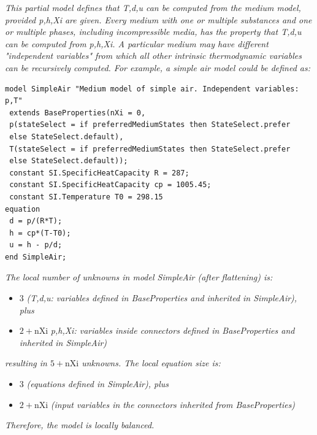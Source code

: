 \documentclass[10pt,a4paper]{report}
\def\Mcommentmid#1{\emph{#1}}
\begin{document}
\Mcommentmid{This partial model defines that \emph{T},\emph{d},\emph{u} can be computed from
the medium model, provided \emph{p},\emph{h},\emph{Xi} are given. Every medium with
one or multiple substances and one or multiple phases, including
incompressible media, has the property that \emph{T},\emph{d},\emph{u} can be computed
from \emph{p},\emph{h},\emph{Xi}. A particular medium may have different "independent
variables" from which all other intrinsic thermodynamic variables can
be recursively computed. For example, a simple air model could be
defined as:}
\begin{lstlisting}[language=modelica]
model SimpleAir "Medium model of simple air. Independent variables: p,T"
 extends BaseProperties(nXi = 0,
 p(stateSelect = if preferredMediumStates then StateSelect.prefer
 else StateSelect.default),
 T(stateSelect = if preferredMediumStates then StateSelect.prefer
 else StateSelect.default));
 constant SI.SpecificHeatCapacity R = 287;
 constant SI.SpecificHeatCapacity cp = 1005.45;
 constant SI.Temperature T0 = 298.15
equation
 d = p/(R*T);
 h = cp*(T-T0);
 u = h - p/d;
end SimpleAir;
\end{lstlisting}

\Mcommentmid{The local number of unknowns in model \emph{SimpleAir} (after
flattening) is:}

\begin{itemize}
\item
  $3$ \Mcommentmid{(\emph{T},\emph{d},\emph{u}: variables defined in
 \emph{BaseProperties} and inherited in \emph{SimpleAir}), plus}
\item
  $2+\textrm{nXi}$ \Mcommentmid{\emph{p},\emph{h},\emph{Xi}: variables inside
  connectors defined in \emph{BaseProperties} and inherited in
  \emph{SimpleAir})}
\end{itemize}

\Mcommentmid{resulting in $5+\textrm{nXi}$ unknowns. The local equation size
is:}

\begin{itemize}
\item
  $3$ \Mcommentmid{(equations defined in SimpleAir), plus}
\item
  $2+\textrm{nXi}$ \Mcommentmid{(input variables in the connectors inherited from
  BaseProperties)}
\end{itemize}

\Mcommentmid{Therefore, the model is locally balanced. }
\end{document}
